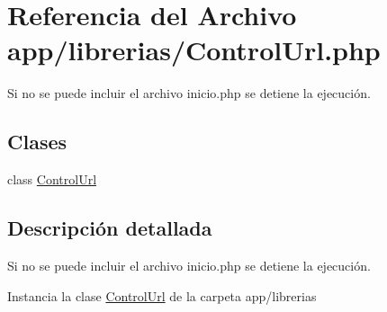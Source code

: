 \hypertarget{ControlUrl_8php}{}\section{Referencia del Archivo app/librerias/\+Control\+Url.php}
\label{ControlUrl_8php}


Si no se puede incluir el archivo inicio.\+php se detiene la ejecución.  


\subsection*{Clases}
\begin{DoxyCompactItemize}
\item 
class \hyperlink{classControlUrl}{Control\+Url}
\end{DoxyCompactItemize}


\subsection{Descripción detallada}
Si no se puede incluir el archivo inicio.\+php se detiene la ejecución. 

Instancia la clase \hyperlink{classControlUrl}{Control\+Url} de la carpeta app/librerias 